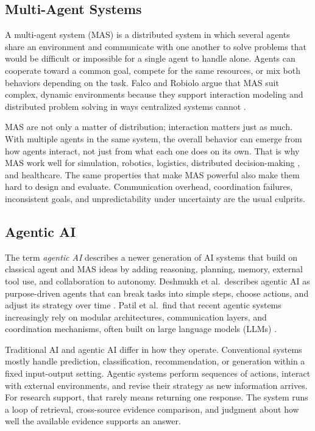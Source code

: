 \documentclass[sn-basic,Numbered]{sn-jnl}
\begin{document}
\subsection{Multi-Agent Systems}

A multi-agent system (MAS) is a distributed system in which several
agents share an environment and communicate with one another to solve
problems that would be difficult or impossible for a single agent to
handle alone. Agents can cooperate toward a common goal, compete for
the same resources, or mix both behaviors depending on the task. Falco
and Robiolo argue that MAS suit complex, dynamic environments because
they support interaction modeling and distributed problem solving in
ways centralized systems cannot \cite{falco2019mas}.

MAS are not only a matter of distribution; interaction matters just as
much. With multiple agents in the same system, the overall behavior
can emerge from how agents interact, not just from what each one does
on its own. That is why MAS work well for simulation, robotics,
logistics, distributed decision-making \cite{falco2019mas}, and
healthcare. The same properties that make MAS powerful also make them
hard to design and evaluate. Communication overhead, coordination
failures, inconsistent goals, and unpredictability under uncertainty
are the usual culprits.

\subsection{Agentic AI}

The term \emph{agentic AI} describes a newer generation of AI systems
that build on classical agent and MAS ideas by adding reasoning,
planning, memory, external tool use, and collaboration to autonomy.
Deshmukh et al.\ describes agentic AI as purpose-driven agents that
can break tasks into simple steps, choose actions, and adjust its strategy
over time \cite{deshmukh2025agentic}. Patil et al.\ find that recent
agentic systems increasingly rely on modular architectures,
communication layers, and coordination mechanisms, often built on
large language models (LLMs) \cite{patil2025agenticaction}.

Traditional AI and agentic AI differ in how they operate. Conventional
systems mostly handle prediction, classification, recommendation, or
generation within a fixed input-output setting. Agentic systems perform
sequences of actions, interact with external environments, and revise
their strategy as new information arrives. For research support, that
rarely means returning one response. The system runs a loop of
retrieval, cross-source evidence comparison, and judgment about how well
the available evidence supports an answer.
\end{document}
